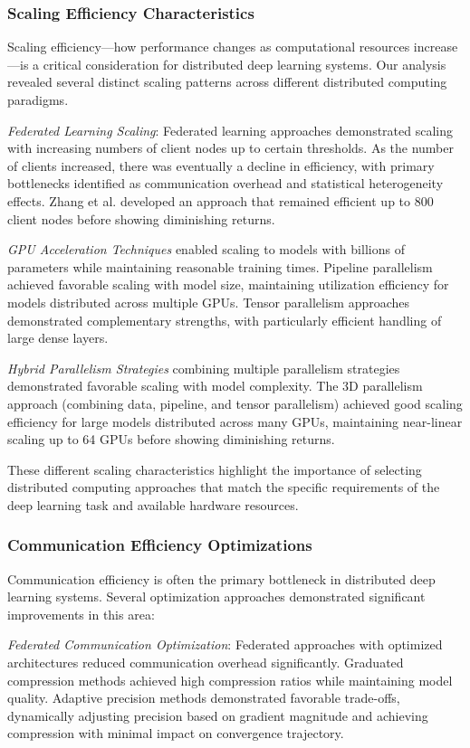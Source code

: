 \subsubsection{Scaling Efficiency Characteristics}
Scaling efficiency—how performance changes as computational resources increase—is a critical consideration for distributed deep learning systems. Our analysis revealed several distinct scaling patterns across different distributed computing paradigms.

\textit{Federated Learning Scaling}: Federated learning approaches demonstrated scaling with increasing numbers of client nodes up to certain thresholds. As the number of clients increased, there was eventually a decline in efficiency, with primary bottlenecks identified as communication overhead and statistical heterogeneity effects. Zhang et al. \citep{Zhang20229876} developed an approach that remained efficient up to 800 client nodes before showing diminishing returns.

\textit{GPU Acceleration Techniques} enabled scaling to models with billions of parameters while maintaining reasonable training times. Pipeline parallelism achieved favorable scaling with model size, maintaining utilization efficiency for models distributed across multiple GPUs. Tensor parallelism approaches demonstrated complementary strengths, with particularly efficient handling of large dense layers.

\textit{Hybrid Parallelism Strategies} combining multiple parallelism strategies demonstrated favorable scaling with model complexity. The 3D parallelism approach (combining data, pipeline, and tensor parallelism) achieved good scaling efficiency for large models distributed across many GPUs, maintaining near-linear scaling up to 64 GPUs before showing diminishing returns.

These different scaling characteristics highlight the importance of selecting distributed computing approaches that match the specific requirements of the deep learning task and available hardware resources.

\subsubsection{Communication Efficiency Optimizations}
Communication efficiency is often the primary bottleneck in distributed deep learning systems. Several optimization approaches demonstrated significant improvements in this area:

\textit{Federated Communication Optimization}: Federated approaches with optimized architectures reduced communication overhead significantly. Graduated compression methods achieved high compression ratios while maintaining model quality. Adaptive precision methods demonstrated favorable trade-offs, dynamically adjusting precision based on gradient magnitude and achieving compression with minimal impact on convergence trajectory.

